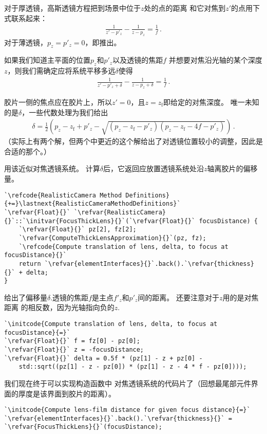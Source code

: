 对于厚透镜，高斯透镜方程把到场景中位于$z$处的点的距离
和它对焦到$z'$的点用下式联系起来：
\begin{align}\label{eq:6.3}
    \frac{1}{z'-p'_z}-\frac{1}{z-p_z}=\frac{1}{f}\, .
\end{align}
对于薄透镜，$p_z=p'_z=0$，即推出。

如果我们知道主平面的位置$p_z$和$p'_z$以及透镜的焦距$f$
并想要对焦沿光轴的某个深度$z$，则我们需确定应将系统平移多远$\delta$使得
\begin{align*}
    \frac{1}{z'-p'_z+\delta}-\frac{1}{z-p_z+\delta}=\frac{1}{f}\, .
\end{align*}

胶片一侧的焦点应在胶片上，所以$z'=0$，且$z=z_{\mathrm{f}}$即给定的对焦深度。
唯一未知的是$\delta$，一些代数处理为我们给出
\begin{align}\label{eq:6.4}
    \delta=\frac{1}{2}\left(p_z-z_{\mathrm{f}}+p'_z-\sqrt{(p_z-z_{\mathrm{f}}-p'_z)(p_z-z_{\mathrm{f}}-4f-p'_z)}\right)\, .
\end{align}
（实际上有两个解，但两个中更近的这个解给出了对透镜位置较小的调整，因此是合适的那个。）

用该近似对焦透镜系统。
计算$\delta$后，它返回应放置透镜系统处沿$z$轴离胶片的偏移量。
\begin{lstlisting}
`\refcode{RealisticCamera Method Definitions}{+=}\lastnext{RealisticCameraMethodDefinitions}`
`\refvar{Float}{}` `\refvar{RealisticCamera}{}`::`\initvar{FocusThickLens}{}`(`\refvar{Float}{}` focusDistance) {
    `\refvar{Float}{}` pz[2], fz[2];
    `\refvar{ComputeThickLensApproximation}{}`(pz, fz);
    `\refcode{Compute translation of lens, delta, to focus at focusDistance}{}`
    return `\refvar{elementInterfaces}{}`.back().`\refvar{thickness}{}` + delta;
}
\end{lstlisting}

给出了偏移量$\delta$.透镜的焦距$f$是主点$f'_z$和$p'_z$间的距离。
还要注意对于$z$用的是对焦距离
的相反数，因为光轴指向负的$z$.
\begin{lstlisting}
`\initcode{Compute translation of lens, delta, to focus at focusDistance}{=}`
`\refvar{Float}{}` f = fz[0] - pz[0];
`\refvar{Float}{}` z = -focusDistance;
`\refvar{Float}{}` delta = 0.5f * (pz[1] - z + pz[0] -
    std::sqrt((pz[1] - z - pz[0]) * (pz[1] - z - 4 * f - pz[0])));
\end{lstlisting}

我们现在终于可以实现构造函数中
对焦透镜系统的代码片了（回想最尾部元件界面的厚度是该界面到胶片的距离）。
\begin{lstlisting}
`\initcode{Compute lens-film distance for given focus distance}{=}`
`\refvar{elementInterfaces}{}`.back().`\refvar{thickness}{}` = `\refvar{FocusThickLens}{}`(focusDistance);
\end{lstlisting}

